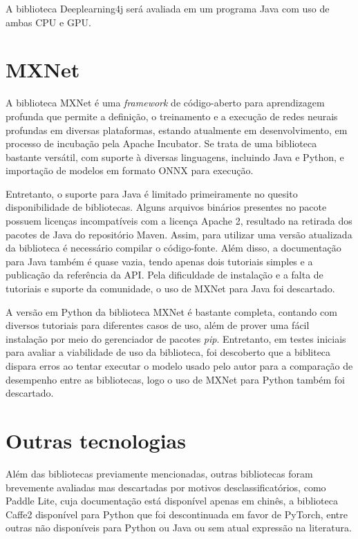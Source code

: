 A biblioteca Deeplearning4j será avaliada em um programa Java com uso de ambas CPU e GPU.

\section{MXNet}

A biblioteca MXNet \cite{ml_site_mxnet} é uma \textit{framework} de código-aberto para aprendizagem profunda que permite a definição, o treinamento e a execução de redes neurais profundas em diversas plataformas, estando atualmente em desenvolvimento, em processo de incubação pela Apache Incubator. Se trata de uma biblioteca bastante versátil, com suporte à diversas linguagens, incluindo Java e Python, e importação de modelos em formato ONNX para execução.

Entretanto, o suporte para Java é limitado primeiramente no quesito disponibilidade de bibliotecas. Alguns arquivos binários presentes no pacote possuem licenças incompatíveis com a licença Apache 2, resultado na retirada dos pacotes de Java do repositório Maven. Assim, para utilizar uma versão atualizada da biblioteca é necessário compilar o código-fonte. Além disso, a documentação para Java também é quase vazia, tendo apenas dois tutoriais simples e a publicação da referência da API. Pela dificuldade de instalação e a falta de tutoriais e suporte da comunidade, o uso de MXNet para Java foi descartado.

A versão em Python da biblioteca MXNet é bastante completa, contando com diversos tutoriais para diferentes casos de uso, além de prover uma fácil instalação por meio do gerenciador de pacotes \textit{pip}. Entretanto, em testes iniciais para avaliar a viabilidade de uso da biblioteca, foi descoberto que a bibliteca dispara erros ao tentar executar o modelo usado pelo autor \cite{eon_ml_classifier_2020} para a comparação de desempenho entre as bibliotecas, logo o uso de MXNet para Python também foi descartado.

\section{Outras tecnologias}

Além das bibliotecas previamente mencionadas, outras bibliotecas foram brevemente avaliadas mas descartadas por motivos desclassificatórios, como Paddle Lite, cuja documentação está disponível apenas em chinês, a biblioteca Caffe2 disponível para Python que foi descontinuada em favor de PyTorch, entre outras não disponíveis para Python ou Java ou sem atual expressão na literatura.